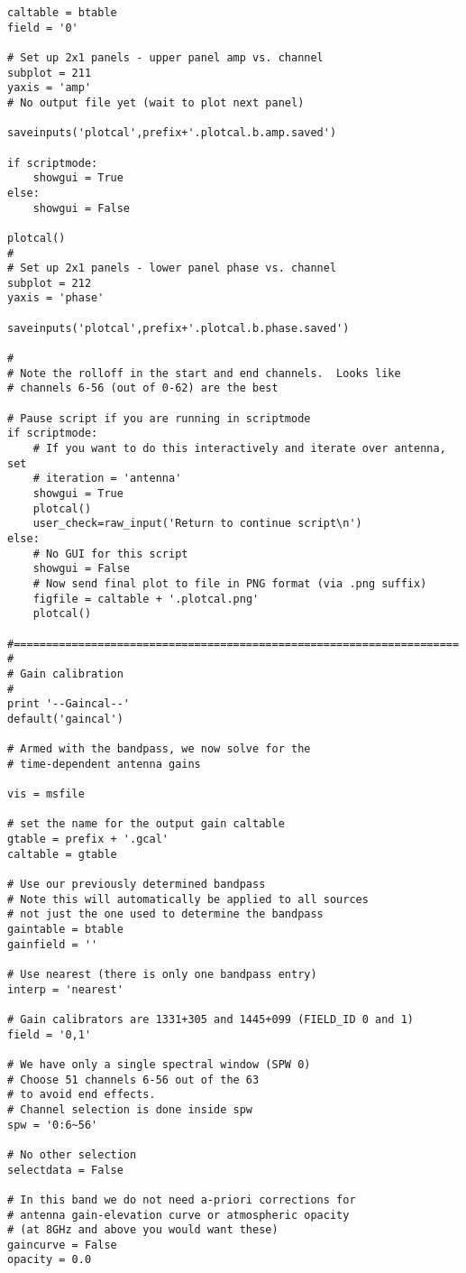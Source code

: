 \begin{verbatim}
caltable = btable
field = '0'

# Set up 2x1 panels - upper panel amp vs. channel
subplot = 211
yaxis = 'amp'
# No output file yet (wait to plot next panel)

saveinputs('plotcal',prefix+'.plotcal.b.amp.saved')

if scriptmode:
    showgui = True
else:
    showgui = False

plotcal()
#
# Set up 2x1 panels - lower panel phase vs. channel
subplot = 212
yaxis = 'phase'

saveinputs('plotcal',prefix+'.plotcal.b.phase.saved')

#
# Note the rolloff in the start and end channels.  Looks like
# channels 6-56 (out of 0-62) are the best

# Pause script if you are running in scriptmode
if scriptmode:
    # If you want to do this interactively and iterate over antenna, set
    # iteration = 'antenna'
    showgui = True
    plotcal()
    user_check=raw_input('Return to continue script\n')
else:
    # No GUI for this script
    showgui = False
    # Now send final plot to file in PNG format (via .png suffix)
    figfile = caltable + '.plotcal.png'
    plotcal()
    
#=====================================================================
#
# Gain calibration
#
print '--Gaincal--'
default('gaincal')

# Armed with the bandpass, we now solve for the
# time-dependent antenna gains

vis = msfile

# set the name for the output gain caltable
gtable = prefix + '.gcal'
caltable = gtable

# Use our previously determined bandpass
# Note this will automatically be applied to all sources
# not just the one used to determine the bandpass
gaintable = btable
gainfield = ''

# Use nearest (there is only one bandpass entry)
interp = 'nearest'

# Gain calibrators are 1331+305 and 1445+099 (FIELD_ID 0 and 1)
field = '0,1'

# We have only a single spectral window (SPW 0)
# Choose 51 channels 6-56 out of the 63
# to avoid end effects.
# Channel selection is done inside spw
spw = '0:6~56'

# No other selection
selectdata = False

# In this band we do not need a-priori corrections for
# antenna gain-elevation curve or atmospheric opacity
# (at 8GHz and above you would want these)
gaincurve = False
opacity = 0.0


\end{verbatim}
